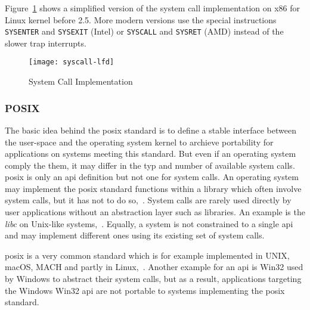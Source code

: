 Figure~\ref{pic:syscalls} shows a simplified version of the system call implementation on x86 for Linux kernel before 2.5\cite{decade-linux-syscalls}.
More modern versions use the special instructions \texttt{SYSENTER} and \texttt{SYSEXIT} (Intel) or \texttt{SYSCALL} and \texttt{SYSRET} (AMD) instead of the slower trap interrupts\cite{decade-linux-syscalls}.

\begin{figure} [ht]
	\centering
	\texttt{[image: syscall-lfd]}
    \caption{System Call Implementation\label{pic:syscalls}\cite{lfd430}}
\end{figure}


\subsubsection{POSIX}
The basic idea behind the \acf{posix} standard is to define a stable interface between the user-space and the operating system kernel to archieve portability for applications on systems meeting this standard.
But even if an operating system comply the them, it may differ in the typ and number of available system calls.
\ac{posix} is only an \ac{api} definition but not one for system calls.
An operating system may implement the \ac{posix} standard functions within a library which often involve system calls, but it has not to do so\cite{lfd430},~\cite{glatz2015betriebssysteme}.
System calls are rarely used directly by user applications without an abstraction layer such as libraries. An example is the \textit{libc} on Unix-like systems\cite{lfd430},~\cite{tanenbaum-modern-operating-systems}.
Equally, a system is not constrained to a single \ac{api} and may implement different ones using its existing set of system calls\cite{glatz2015betriebssysteme}.

\ac{posix} is a very common standard which is for example implemented in UNIX, macOS, MACH and partly in Linux\cite{tanenbaum-modern-operating-systems},~\cite{glatz2015betriebssysteme}. 
Another example for an \ac{api} is Win32 used by Windows to abstract their system calls, but as a result, applications targeting the Windows Win32 \ac{api} are not portable to systems implementing the \ac{posix} standard.


